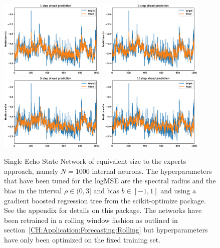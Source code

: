 \begin{figure}
    \begin{center}
        \includegraphics[width=0.45\textwidth]{Plots/Prediction/Single_logMSE_rolling_1step.eps}
        \includegraphics[width=0.45\textwidth]{Plots/Prediction/Single_logMSE_rolling_2step.eps} \\
        \includegraphics[width=0.45\textwidth]{Plots/Prediction/Single_logMSE_rolling_5step.eps}
        \includegraphics[width=0.45\textwidth]{Plots/Prediction/Single_logMSE_rolling_10step.eps}
    \end{center}
    \caption{Single Echo State Network of equivalent size to the experts approach, namely $N=1000$ internal neurons. The hyperparameters that have been tuned for the logMSE are the spectral radius and the bias in the interval $\rho \in (0, 3]$ and bias $b \in [-1,1]$ and using a gradient boosted regression tree from the scikit-optimize package. See the appendix for details on this package. The networks have been retrained in a rolling window fashion as outlined in section \ref{CH:Application:Forecasting:Rolling} but hyperparameters have only been optimized on the fixed training set.}
    \label{FIG:SingleESNRolling}
\end{figure}


